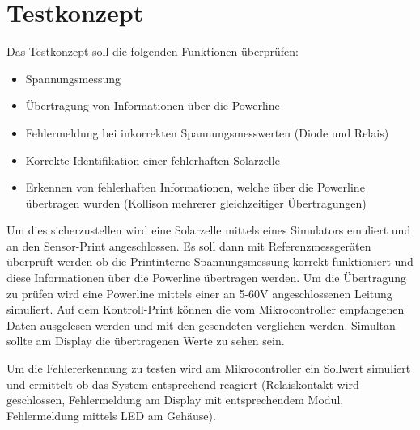 %
%
%
\section{Testkonzept}

Das Testkonzept soll die folgenden Funktionen überprüfen:
\begin{itemize}
	\item Spannungsmessung
	\item Übertragung von Informationen über die Powerline
	\item Fehlermeldung bei inkorrekten Spannungsmesswerten (Diode und Relais)
	\item Korrekte Identifikation einer fehlerhaften Solarzelle
	\item Erkennen von fehlerhaften Informationen, welche über die Powerline übertragen wurden (Kollison mehrerer gleichzeitiger Übertragungen)
\end{itemize}

Um dies sicherzustellen wird eine Solarzelle mittels eines Simulators emuliert und an den Sensor-Print angeschlossen. Es soll dann mit Referenzmessgeräten überprüft werden ob die Printinterne Spannungsmessung korrekt funktioniert und diese Informationen über die Powerline übertragen werden. 
Um die Übertragung zu prüfen wird eine Powerline mittels einer an 5-60V angeschlossenen Leitung simuliert. Auf dem Kontroll-Print können die vom Mikrocontroller empfangenen Daten ausgelesen werden und mit den gesendeten verglichen werden. Simultan sollte am Display die übertragenen Werte zu sehen sein. 

Um die Fehlererkennung zu testen wird am Mikrocontroller ein Sollwert simuliert und ermittelt ob das System entsprechend reagiert (Relaiskontakt wird geschlossen, Fehlermeldung am Display mit entsprechendem Modul, Fehlermeldung mittels LED am Gehäuse).